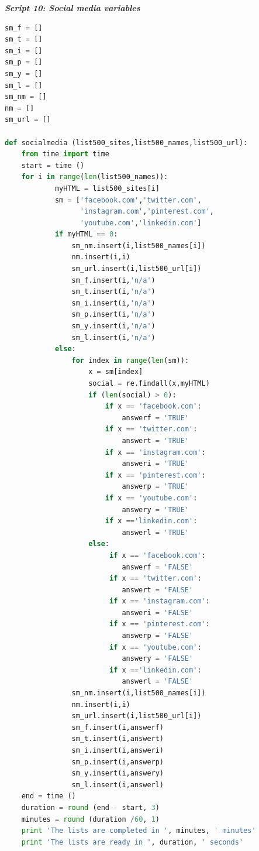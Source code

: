 \documentclass{book}
\begin{document}
\begin{center}
\textit{\textbf{Script 10: Social media variables}}\label{p10}
\end{center}
\begin{lstlisting}[language=Python]
sm_f = []
sm_t = []
sm_i = []
sm_p = []
sm_y = []
sm_l = []   
sm_nm = [] 
nm = []
sm_url = []
 
def socialmedia (list500_sites,list500_names,list500_url):
    from time import time 
    start = time ()
    for i in range(len(list500_names)):        
            myHTML = list500_sites[i]
            sm = ['facebook.com','twitter.com',
                  'instagram.com','pinterest.com',
                  'youtube.com','linkedin.com'] 
            if myHTML == 0:
                sm_nm.insert(i,list500_names[i]) 
                nm.insert(i,i)
                sm_url.insert(i,list500_url[i])
                sm_f.insert(i,'n/a')
                sm_t.insert(i,'n/a')
                sm_i.insert(i,'n/a')
                sm_p.insert(i,'n/a')
                sm_y.insert(i,'n/a')
                sm_l.insert(i,'n/a')
            else:
                for index in range(len(sm)):
                    x = sm[index]
                    social = re.findall(x,myHTML)                                
                    if (len(social) > 0):
                        if x == 'facebook.com':
                            answerf = 'TRUE'
                        if x == 'twitter.com':
                            answert = 'TRUE'
                        if x == 'instagram.com':
                            answeri = 'TRUE'
                        if x == 'pinterest.com':
                            answerp = 'TRUE'
                        if x == 'youtube.com':
                            answery = 'TRUE'
                        if x =='linkedin.com':
                            answerl = 'TRUE'                   
                    else:
                         if x == 'facebook.com':
                            answerf = 'FALSE'
                         if x == 'twitter.com':
                            answert = 'FALSE'
                         if x == 'instagram.com':
                            answeri = 'FALSE'
                         if x == 'pinterest.com':
                            answerp = 'FALSE'
                         if x == 'youtube.com':
                            answery = 'FALSE'
                         if x =='linkedin.com':
                            answerl = 'FALSE'                
                sm_nm.insert(i,list500_names[i]) 
                nm.insert(i,i)
                sm_url.insert(i,list500_url[i])
                sm_f.insert(i,answerf)
                sm_t.insert(i,answert)
                sm_i.insert(i,answeri)
                sm_p.insert(i,answerp)
                sm_y.insert(i,answery)
                sm_l.insert(i,answerl)
    end = time ()
    duration = round (end - start, 3)
    minutes = round (duration /60, 1)
    print 'The lists are completed in ', minutes, ' minutes' 
    print 'The lists are ready in ', duration, ' seconds'
 

\end{lstlisting}
\end{document}
